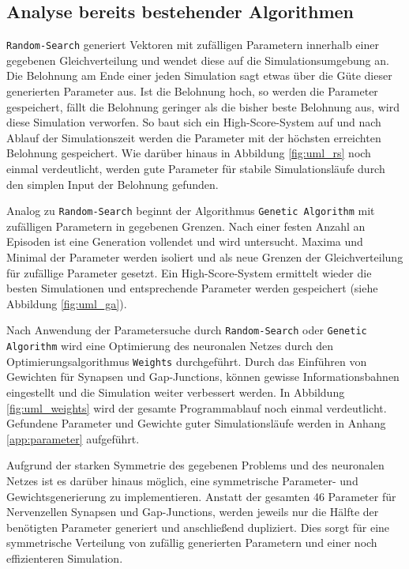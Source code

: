 	\subsection{Analyse bereits bestehender Algorithmen}
		\texttt{Random-Search} generiert Vektoren mit zufälligen Parametern innerhalb einer gegebenen Gleichverteilung und wendet diese auf die Simulationsumgebung an. Die Belohnung am Ende einer jeden Simulation sagt etwas über die Güte dieser generierten Parameter aus. Ist die Belohnung hoch, so werden die Parameter gespeichert, fällt die Belohnung geringer als die bisher beste Belohnung aus, wird diese Simulation verworfen. So baut sich ein High-Score-System auf und nach Ablauf der Simulationszeit werden die Parameter mit der höchsten erreichten Belohnung gespeichert.	Wie darüber hinaus in Abbildung \ref{fig:uml_rs} noch einmal verdeutlicht, werden gute Parameter für stabile Simulationsläufe durch den simplen Input der Belohnung gefunden.
		
		Analog zu \texttt{Random-Search} beginnt der Algorithmus \texttt{Genetic Algorithm} mit zufälligen Parametern in gegebenen Grenzen. Nach einer festen Anzahl an Episoden ist eine Generation vollendet und wird untersucht. Maxima und Minimal der Parameter werden isoliert und als neue Grenzen der Gleichverteilung für zufällige Parameter gesetzt. Ein High-Score-System ermittelt wieder die besten Simulationen und entsprechende Parameter werden gespeichert (siehe Abbildung \ref{fig:uml_ga}).
		
		Nach Anwendung der Parametersuche durch \texttt{Random-Search} oder \texttt{Genetic Algorithm} wird eine Optimierung des neuronalen Netzes durch den Optimierungsalgorithmus \texttt{Weights} durchgeführt. Durch das Einführen von Gewichten für Synapsen und Gap-Junctions, können gewisse Informationsbahnen eingestellt und die Simulation weiter verbessert werden. In Abbildung \ref{fig:uml_weights} wird der gesamte Programmablauf noch einmal verdeutlicht. Gefundene Parameter und Gewichte guter Simulationsläufe werden in Anhang \ref{app:parameter} aufgeführt.
		
		Aufgrund der starken Symmetrie des gegebenen Problems und des neuronalen Netzes ist es darüber hinaus möglich, eine symmetrische Parameter- und Gewichtsgenerierung zu implementieren. Anstatt der gesamten 46 Parameter für Nervenzellen Synapsen und Gap-Junctions, werden jeweils nur die Hälfte der benötigten Parameter generiert und anschließend dupliziert. Dies sorgt für eine symmetrische Verteilung von zufällig generierten Parametern und einer noch effizienteren Simulation.
